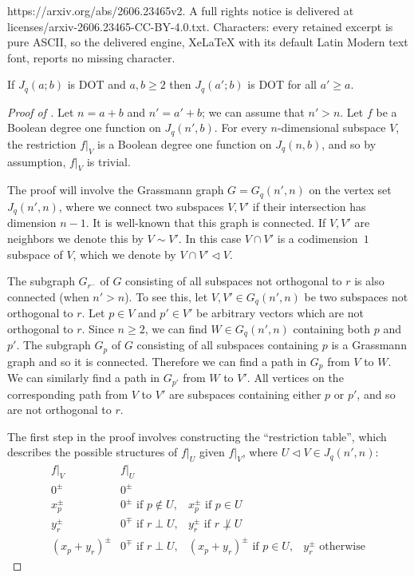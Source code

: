 \documentclass[10pt,a4paper]{amsart}
\providecommand{\subs}{\triangleleft}
\begin{document}
https://arxiv.org/abs/2606.23465v2. A full rights notice is delivered at licenses/arxiv-2606.23465-CC-BY-4.0.txt. Characters: every retained excerpt is pure ASCII, so the delivered engine, XeLaTeX with its default Latin Modern text font, reports no missing character.
\begin{proposition} \label{pro:step3}
If $J_q(a;b)$ is DOT and $a,b \ge 2$ then $J_q(a';b)$ is DOT for all $a' \ge a$.    
\end{proposition}

\begin{proof}[Proof of ]
Let $n = a+b$ and $n' = a'+b$; we can assume that $n' > n$. Let $f$ be a Boolean degree one function on $J_q(n',b)$. For every $n$-dimensional subspace $V$, the restriction $f|_V$ is a Boolean degree one function on $J_q(n,b)$, and so by assumption, $f|_V$ is trivial.

The proof will involve the Grassmann graph $G = G_q(n',n)$ on the vertex set $J_q(n',n)$, where we connect two subspaces $V,V'$ if their intersection has dimension $n-1$. It is well-known that this graph is connected. If $V,V'$ are neighbors we denote this by $V \sim V'$.
In this case $V \cap V'$ is a codimension~$1$ subspace of $V$, which we denote by $V \cap V' \subs V$.

The subgraph $G_{r^-}$ of $G$ consisting of all subspaces not orthogonal to $r$ is also connected (when $n' > n$). To see this, let $V,V' \in G_q(n',n)$ be two subspaces not orthogonal to $r$. Let $p \in V$ and $p' \in V'$ be arbitrary vectors which are not orthogonal to $r$. Since $n \ge 2$, we can find $W \in G_q(n',n)$ containing both $p$ and $p'$. The subgraph $G_p$ of $G$ consisting of all subspaces containing $p$ is a Grassmann graph and so it is connected. Therefore we can find a path in $G_p$ from $V$ to $W$. We can similarly find a path in $G_{p'}$ from $W$ to $V'$. All vertices on the corresponding path from $V$ to $V'$ are subspaces containing either $p$ or $p'$, and so are not orthogonal to $r$.

\smallskip

The first step in the proof involves constructing the ``restriction table'', which describes the possible structures of $f|_U$ given $f|_V$, where $U \subs V \in J_q(n',n)$:
\[
\begin{array}{c|lll}
f|_V & f|_U \\\hline
0^\pm & 0^\pm \\
x_p^\pm & 0^\pm \text{ if } p \notin U, & x_p^\pm \text{ if } p \in U \\
y_r^\pm & 0^\mp \text{ if } r \perp U, & y_r^\pm \text{ if } r \not\perp U \\
(x_p+y_r)^\pm & 0^\mp \text{ if } r \perp U, & (x_p+y_r)^\pm \text{ if } p \in U, & y_r^\pm \text{ otherwise} 
\end{array}
\]


\end{proof}
\end{document}
